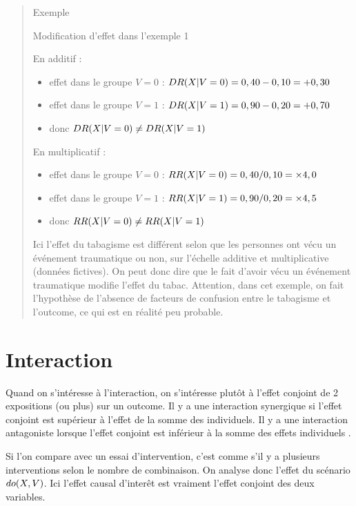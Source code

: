 \documentclass[
]{book}
\providecommand{\tightlist}{%
  \setlength{\itemsep}{0pt}\setlength{\parskip}{0pt}}
\begin{document}
\begin{quote}
Exemple

Modification d'effet dans l'exemple 1

En additif :

\begin{itemize}
\tightlist
\item
  effet dans le groupe \(V=0\) : \(\small DR (X | V=0) = 0,40 - 0,10 = +0,30\)
\item
  effet dans le groupe \(V=1\) : \(\small DR (X | V=1) = 0,90 - 0,20 = +0,70\)
\item
  donc \(\small DR (X | V=0) \neq DR (X | V=1)\)
\end{itemize}

En multiplicatif :

\begin{itemize}
\tightlist
\item
  effet dans le groupe \(V=0\) : \(\small RR(X | V=0) = 0,40/0,10 = \times 4,0\)
\item
  effet dans le groupe \(V=1\) : \(\small RR(X | V=1) = 0,90/0,20 = \times 4,5\)
\item
  donc \(\small RR(X | V=0) \neq RR(X | V=1)\)
\end{itemize}

Ici l'effet du tabagisme est différent selon que les personnes ont vécu un événement traumatique ou non, sur l'échelle additive et multiplicative (données fictives). On peut donc dire que le fait d'avoir vécu un événement traumatique modifie l'effet du tabac. Attention, dans cet exemple, on fait l'hypothèse de l'absence de facteurs de confusion entre le tabagisme et l'outcome, ce qui est en réalité peu probable.
\end{quote}

\hypertarget{interaction}{%
\section{Interaction}\label{interaction}}

Quand on s'intéresse à l'interaction, on s'intéresse plutôt à l'effet conjoint de 2 expositions (ou plus) sur un outcome. Il y a une interaction synergique si l'effet conjoint est supérieur à l'effet de la somme des individuels. Il y a une interaction antagoniste lorsque l'effet conjoint est inférieur à la somme des effets individuels \citet{corraini_effect_2017}.

Si l'on compare avec un essai d'intervention, c'est comme s'il y a plusieurs interventions selon le nombre de combinaison. On analyse donc l'effet du scénario \(\small do(X, V)\). Ici l'effet causal d'interêt est vraiment l'effet conjoint des deux variables.
\end{document}
